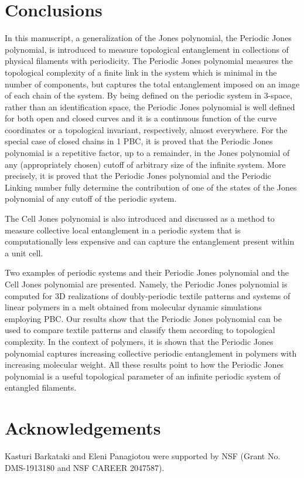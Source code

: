 \documentclass{article}
\begin{document}
\section{Conclusions}\label{sec_conc}
In this manuscript, a generalization of the Jones polynomial, the Periodic Jones polynomial, is introduced to measure topological entanglement in collections of physical filaments with periodicity. The Periodic Jones polynomial measures the topological complexity of a finite link in the system which is minimal in the number of components, but captures the total entanglement imposed on an image of each chain of the system. By being defined on the periodic system in 3-space, rather than an identification space, the Periodic Jones polynomial is well defined for both open and closed curves and it is a continuous function of the curve coordinates or a topological invariant, respectively, almost everywhere. For the special case of closed chains in 1 PBC, it is proved that the Periodic Jones polynomial is a repetitive factor, up to a remainder, in the Jones polynomial of any (appropriately chosen) cutoff of arbitrary size of the infinite system. More precisely, it is proved that the Periodic Jones polynomial and the Periodic Linking number \cite{Panagiotou2015} fully determine the contribution of one of the states of the Jones polynomial of any cutoff of the periodic system. 

The Cell Jones polynomial is also introduced and discussed as a method to measure collective local entanglement in a periodic system that is computationally less expensive and can capture the entanglement present within a unit cell.

Two examples of periodic systems and their Periodic Jones polynomial and the Cell Jones polynomial are presented. Namely, the Periodic Jones polynomial is computed for 3D realizations of doubly-periodic textile patterns and systems of linear polymers in a melt obtained from molecular dynamic simulations employing PBC. Our results show that the Periodic Jones polynomial can be used to compare textile patterns and classify them according to topological complexity. In the context of polymers, it is shown that the Periodic Jones polynomial captures increasing collective periodic entanglement in polymers with increasing molecular weight. All these results point to how the Periodic Jones polynomial is a useful topological parameter of an infinite periodic system of entangled filaments.
 
\section{Acknowledgements}
Kasturi Barkataki and Eleni Panagiotou were supported by NSF (Grant No. DMS-1913180 and NSF CAREER 2047587).


%


\end{document}
